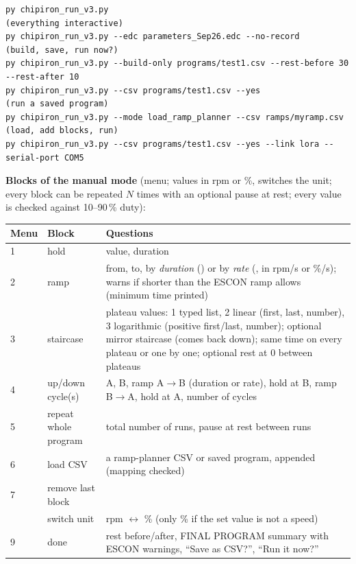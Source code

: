 \documentclass[a4paper,11pt]{article}
\newcommand{\code}[1]{\texttt{\detokenize{#1}}}
\begin{document}
\begin{lstlisting}[title={Terminal (VS Code): run examples}]
py chipiron_run_v3.py                                              (everything interactive)
py chipiron_run_v3.py --edc parameters_Sep26.edc --no-record       (build, save, run now?)
py chipiron_run_v3.py --build-only programs/test1.csv --rest-before 30 --rest-after 10
py chipiron_run_v3.py --csv programs/test1.csv --yes               (run a saved program)
py chipiron_run_v3.py --mode load_ramp_planner --csv ramps/myramp.csv   (load, add blocks, run)
py chipiron_run_v3.py --csv programs/test1.csv --yes --link lora --serial-port COM5
\end{lstlisting}

\textbf{Blocks of the manual mode} (menu; values in rpm or \%, \code{u} switches the unit; every block can be repeated $N$ times with an optional pause at rest; every value is checked against 10--90\,\% duty):

\begin{longtable}{@{}L{1.0cm}L{2.6cm}L{11.4cm}@{}}
\toprule
\textbf{Menu} & \textbf{Block} & \textbf{Questions} \\
\midrule
{} & hold & value, duration \\
2 & ramp & from, to, by \emph{duration} (\code{d}) or by \emph{rate} (\code{r}, in rpm/s or \%/s); warns if shorter than the ESCON ramp allows (minimum time printed) \\
3 & staircase & plateau values: 1 typed list, 2 linear (first, last, number), 3 logarithmic (positive first/last, number); optional mirror staircase (comes back down); same time on every plateau or one by one; optional rest at 0 between plateaus \\
4 & up/down cycle(s) & A, B, ramp A$\to$B (duration or rate), hold at B, ramp B$\to$A, hold at A, number of cycles \\
5 & repeat whole program & total number of runs, pause at rest between runs \\
6 & load CSV & a ramp-planner CSV or saved program, appended (mapping checked) \\
7 & remove last block & \\
\code{u} & switch unit & rpm $\leftrightarrow$ \% (only \% if the set value is not a speed) \\
9 & done & rest before/after, FINAL PROGRAM summary with ESCON warnings, ``Save as CSV?'', ``Run it now?'' \\
\bottomrule
\end{longtable}
\end{document}
